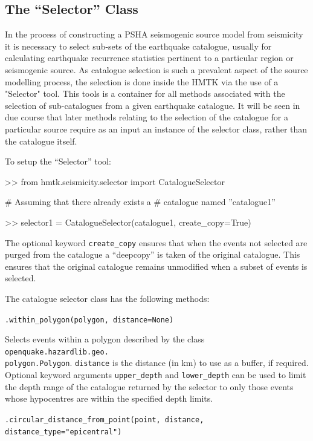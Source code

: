 \subsection{The ``Selector'' Class}

In the process of constructing a PSHA seismogenic source model from seismicity it is necessary to select sub-sets of the earthquake catalogue, usually for calculating earthquake recurrence statistics pertinent to a particular region or seismogenic source. As catalogue selection is such a prevalent aspect of the source modelling process, the selection is done inside the HMTK via the use of a "Selector" tool. This tools is a container for all methods associated with the selection of sub-catalogues from a given earthquake catalogue. It will be seen in due course that later methods relating to the selection of the catalogue for a particular source require as an input an instance of the selector class, rather than the catalogue itself.

To setup the ``Selector'' tool:

\begin{python}[frame=single]
>> from hmtk.seismicity.selector import CatalogueSelector

# Assuming that there already exists a 
# catalogue named ''catalogue1''

>> selector1 = CatalogueSelector(catalogue1,
                                 create_copy=True)

\end{python}

The optional keyword \verb=create_copy= ensures that when the events not selected are purged from the catalogue a ``deepcopy'' is taken of the original catalogue. This ensures that the original catalogue remains unmodified when a subset of events is selected.

The catalogue selector class has the following methods:

\verb;.within_polygon(polygon, distance=None);

Selects events within a polygon described by the class \verb=openquake.hazardlib.geo.=\\\verb=polygon.Polygon=. \verb=distance= is the distance (in km) to use as a buffer, if required. Optional keyword arguments \verb=upper_depth= and \verb=lower_depth= can be used to limit the depth range of the catalogue returned by the selector to only those events whose hypocentres are within the specified depth limits.

\verb;.circular_distance_from_point(point, distance, distance_type="epicentral");

